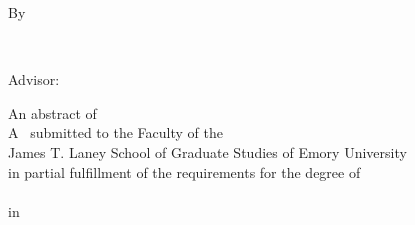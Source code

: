 
\vspace*{\fill}

\begin{singlespace}
    \begin{center}
        \mytitle
        
        \vspace{0.7in}
        
        By
        
        \vspace{0.7in}
        
        \myname\\
        \mypreviousdegrees
        
        \vspace{0.75in}
        
        Advisor: \advisor
        
        \vspace{2.5in}
        
        An abstract of\\
        A \mydoctype~submitted to the Faculty of the\\
        James T. Laney School of Graduate Studies of Emory University\\
        in partial fulfillment of the requirements for the degree of \\
        \mydegree\\
        in \mydepartment\\
        \myyear
    \end{center}
\end{singlespace}

\vfill
\newpage
